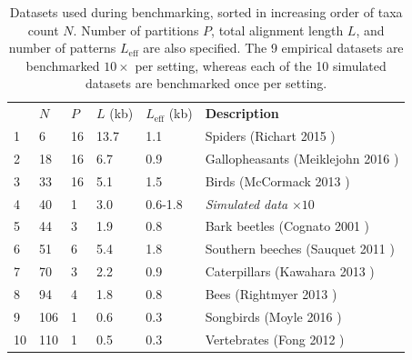 \documentclass[10pt,letterpaper]{article}
\begin{document}
\begin{table}[h!]
\centering
\begin{tabular}{|l| l l l l l|} 
 \hline
  & $N$ & $P$ & $L$ (kb) & $L_\text{eff}$ (kb) & \textbf{Description} \\
 
1  &  6  &  16  &  13.7  &  1.1  &  Spiders (Richart 2015 \cite{Richart_2016}) \\ 

2  &  18  &  16  &  6.7  &  0.9  &  Gallopheasants (Meiklejohn 2016 \cite{Meiklejohn_2016}) \\ 

3  &  33  &  16  &  5.1  &  1.5  &  Birds (McCormack 2013 \cite{McCormack_2013}) \\ 

4  &  40  &  1 &  3.0  &  0.6-1.8  &  \textit{Simulated data} $\times 10$ \\ 

5  &  44  &  3  &  1.9  &  0.8  &  Bark beetles (Cognato 2001 \cite{Cognato_2001}) \\ 

6  &  51  &  6  &  5.4  &  1.8  &  Southern beeches (Sauquet 2011 \cite{Sauquet_2011}) \\ 

7  &  70  &  3  &  2.2  &  0.9  &  Caterpillars (Kawahara 2013 \cite{Kawahara_2013}) \\ 

8  &  94  &  4  &  1.8  &  0.8  &  Bees (Rightmyer 2013 \cite{Rightmyer_2013}) \\ 

9  &  106  &  1  &  0.6  &  0.3  & Songbirds (Moyle 2016 \cite{Moyle_2016}) \\ 

10  &  110  &  1  &  0.5  &  0.3  &  Vertebrates (Fong 2012 \cite{Fong_2012}) \\ 



 \hline
\end{tabular}
\caption{Datasets used during benchmarking, sorted in increasing order of taxa count $N$. Number of partitions $P$, total alignment length $L$, and number of patterns $L_\text{eff}$ are also specified. The 9 empirical datasets are benchmarked $10 \times$ per setting, whereas each of the 10 simulated datasets are benchmarked once per setting.}
\label{table:datasets}
\end{table}
\end{document}
